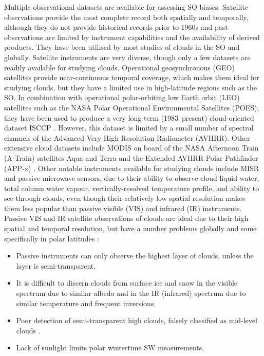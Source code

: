 Multiple observational datasets are available for assessing SO biases.
Satellite observations provide the most complete record both spatially and
temporally, although they do not provide historical records prior to
1960s and past observations are limited by instrument capabilities and
the availability of derived products. They have been utilised by most studies
of clouds in the SO and globally. Satellite instruments are very diverse, though only a few
datasets are readily available for studying clouds.
Operational geosynchronous (GEO) satellites provide near-continuous temporal
coverage,
which makes them ideal for studying clouds, but they have a limited use in
high-latitude regions such as the SO. In combination with operational polar-orbiting
low Earth orbit (LEO) satellites such as the NASA
Polar Operational Environmental Satellites (POES),
they have been used to produce a very long-term (1983--present) cloud-oriented
dataset ISCCP
\citep{schiffer1983}. However, this dataset is limited by
a small number of spectral channels of the Advanced Very High Resolution Radiometer
(AVHRR). Other extensive
cloud datasets include MODIS
on board of the NASA Afternoon Train (A-Train) satellites Aqua and Terra
and the Extended AVHRR Polar Pathfinder (APP-x) \citep{meier1997}. Other notable instruments available
for studying clouds include MISR
and passive
microwave sensors, due to their ability to observe cloud liquid water,
total column water vapour, vertically-resolved temperature profile, and
ability to see through clouds, even though their relatively low spatial
resolution makes them less popular than passive visible (VIS) and infrared (IR)
instruments.
Passive VIS and IR satellite observations of clouds are ideal due to their high
spatial and temporal resolution, but have a number problems globally and some
specifically in polar latitudes \citep{bromwich2012}:

\begin{itemize}
\item Passive instruments can only observe the highest layer of clouds, unless
the layer is semi-transparent.
\item It is difficult to discern clouds from surface ice and snow
in the visible spectrum due to similar albedo and in the IR (infrared)
spectrum due to similar
temperature and frequent inversions.
\item Poor detection of semi-transparent high clouds, falsely classified as
mid-level clouds \citep{haynes2011}.
\item Lack of sunlight limits polar wintertime SW measurements.
\end{itemize}

